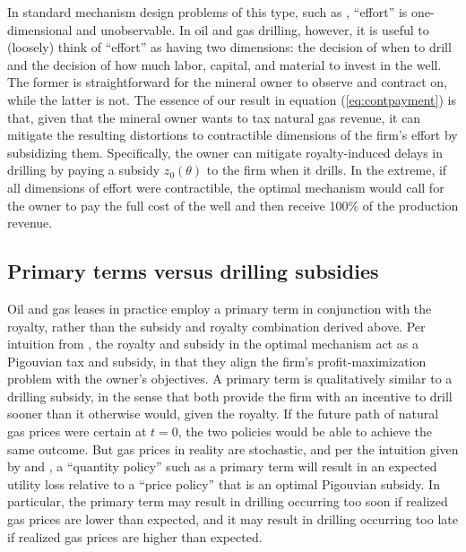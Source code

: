 \documentclass[12pt]{article}
\begin{document}
In standard mechanism design problems of this type, such as \citet{bib:laffonttirole1986}, ``effort'' is one-dimensional and unobservable. In oil and gas drilling, however, it is useful to (loosely) think of ``effort'' as having two dimensions: the decision of when to drill and the decision of how much labor, capital, and material to invest in the well. The former is straightforward for the mineral owner to observe and contract on, while the latter is not. The essence of our result in equation (\ref{eq:contpayment}) is that, given that the mineral owner wants to tax natural gas revenue, it can mitigate the resulting distortions to contractible dimensions of the firm's effort by subsidizing them. Specifically, the owner can mitigate royalty-induced delays in drilling by paying a subsidy $z_0(\theta)$ to the firm when it drills. In the extreme, if all dimensions of effort were contractible, the optimal mechanism would call for the owner to pay the full cost of the well and then receive 100\% of the production revenue.

\subsection{Primary terms versus drilling subsidies}

Oil and gas leases in practice employ a primary term in conjunction with the royalty, rather than the subsidy and royalty combination derived above. Per intuition from \citet{bib:board}, the royalty and subsidy in the optimal mechanism act as a Pigouvian tax and subsidy, in that they align the firm's profit-maximization problem with the owner's objectives. A primary term is qualitatively similar to a drilling subsidy, in the sense that both provide the firm with an incentive to drill sooner than it otherwise would, given the royalty. If the future path of natural gas prices were certain at $t=0$, the two policies would be able to achieve the same outcome. But gas prices in reality are stochastic, and per the intuition given by \citet{bib:weitzman} and \citet{bib:kaplow}, a ``quantity policy'' such as a primary term will result in an expected utility loss relative to a ``price policy'' that is an optimal Pigouvian subsidy. In particular, the primary term may result in drilling occurring too soon if realized gas prices are lower than expected, and it may result in drilling occurring too late if realized gas prices are higher than expected.
\end{document}
